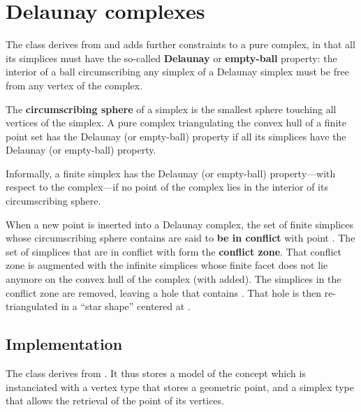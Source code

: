 {%

\section{Delaunay complexes}%

The class  derives from
 and adds further constraints to a
pure complex, in that all its simplices must have the so-called
\textbf{Delaunay} or \textbf{empty-ball} property: the interior of a ball
circumscribing any simplex of a Delaunay simplex must be free from any vertex
of the complex.

The \textbf{circumscribing sphere} of a simplex  is the smallest sphere
touching all vertices of the simplex. A pure complex triangulating the convex
hull of a finite point set has the Delaunay (or empty-ball) property if all
its simplices have the Delaunay (or empty-ball) property.

Informally, a finite simplex has the Delaunay (or empty-ball) property---with
respect to the complex---if no point of the complex lies in the interior of
its circumscribing sphere.

When a new point  is inserted into a Delaunay complex, the set of
finite simplices whose circumscribing sphere contains  are said to
\textbf{be in conflict} with point . The set of simplices that are in
conflict with  form the \textbf{conflict zone}. That conflict zone is
augmented with the infinite simplices whose finite facet does not lie
anymore on the convex hull of the complex (with  added). The simplices
in the conflict zone are removed, leaving a hole that contains . That
hole is then re-triangulated in a ``star shape'' centered at .


\subsection{Implementation}

The class  derives from
. It thus stores a model  of
the concept  which is instanciated with a vertex
type that stores a geometric point, and a simplex type that allows the
retrieval of the point of its vertices.

}
